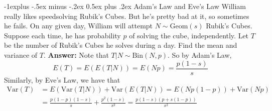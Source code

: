 \documentclass[6pt, landscape]{article}
\makeatletter
\renewcommand{\subsection}{\@startsection{subsection}{2}{0mm}%
                                {-1explus -.5ex minus -.2ex}%
                                {0.5ex plus .2ex}%
                                {\small\bfseries}}
\newcommand{\var}{\textrm{Var}}
\newcommand{\Bin}{\textrm{Bin}}
\newcommand{\Geom}{\textrm{Geom}}
\makeatother
\begin{document}
\begin{multicols}{3}
        \subsection{Adam's Law and Eve's Law}
        William really likes speedsolving Rubik's Cubes. But he's pretty bad at it, so sometimes he fails. On any given day, William will attempt $N \sim \Geom(s)$ Rubik's Cubes. Suppose each time, he has probability $p$ of solving the cube, independently. Let $T$ be the number of Rubik's Cubes he solves during a day. Find the mean and variance of $T$. \textbf{Answer:} Note that $T|N \sim \Bin(N,p)$. So by Adam's Law, \[E(T) = E(E(T|N)) = E(Np) = \boxed{\displaystyle\frac {p (1-s)}{s}}\] Similarly, by Eve's Law, we have that
        \begin{align*}
                \var(T) & = E(\var(T|N)) + \var(E(T|N)) =  E(Np(1-p)) + \var(Np) \\&= \frac{p(1-p)(1-s)}{s} +  \frac{p^2(1-s)}{s^2} = \boxed{\frac{p(1-s)(p+s(1-p))}{s^2}}
        \end{align*}


\end{multicols}
\end{document}
